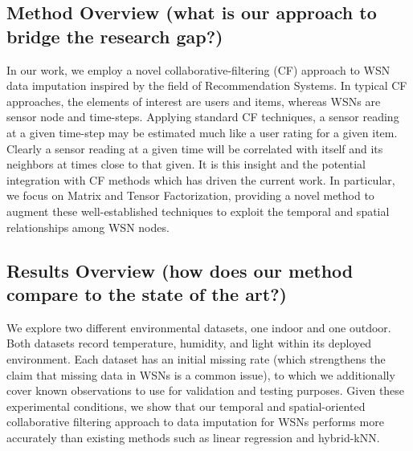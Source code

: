 \subsection{Method Overview (what is our approach to bridge the research gap?)}
In our work, we employ a novel collaborative-filtering (CF) approach to WSN data imputation inspired by the field of Recommendation Systems.
In typical CF approaches, the elements of interest are users and items, whereas WSNs are sensor node and time-steps.
Applying standard CF techniques, a sensor reading at a given time-step may be estimated much like a user rating for a given item.
Clearly a sensor reading at a given time will be correlated with itself and its neighbors at times close to that given.
It is this insight and the potential integration with CF methods which has driven the current work.
In particular, we focus on Matrix and Tensor Factorization, providing a novel method to augment these well-established techniques to exploit the temporal and spatial relationships among WSN nodes.

\subsection{Results Overview (how does our method compare to the state of the art?)}
We explore two different environmental datasets, one indoor and one outdoor.
Both datasets record temperature, humidity, and light within its deployed environment.
Each dataset has an initial missing rate (which strengthens the claim that missing data in WSNs is a common issue), to which we additionally cover known observations to use for validation and testing purposes.
Given these experimental conditions, we show that our temporal and spatial-oriented collaborative filtering approach to data imputation for WSNs performs more accurately than existing methods such as linear regression and hybrid-kNN.

